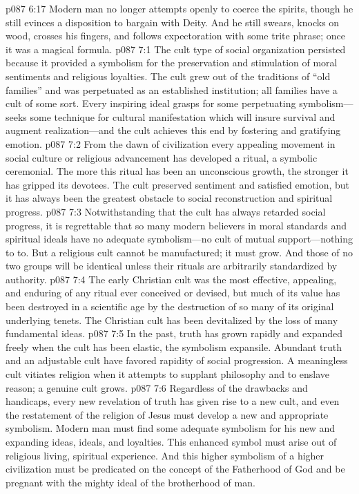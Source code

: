 \pc \vs p087 6:17 Modern man no longer attempts openly to coerce the spirits, though he still evinces a disposition to bargain with Deity. And he still swears, knocks on wood, crosses his fingers, and follows expectoration with some trite phrase; once it was a magical formula.
\vs p087 7:1 The cult type of social organization persisted because it provided a symbolism for the preservation and stimulation of moral sentiments and religious loyalties. The cult grew out of the traditions of “old families” and was perpetuated as an established institution; all families have a cult of some sort. Every inspiring ideal grasps for some perpetuating symbolism---seeks some technique for cultural manifestation which will insure survival and augment realization---and the cult achieves this end by fostering and gratifying emotion.
\vs p087 7:2 From the dawn of civilization every appealing movement in social culture or religious advancement has developed a ritual, a symbolic ceremonial. The more this ritual has been an unconscious growth, the stronger it has gripped its devotees. The cult preserved sentiment and satisfied emotion, but it has always been the greatest obstacle to social reconstruction and spiritual progress.
\vs p087 7:3 Notwithstanding that the cult has always retarded social progress, it is regrettable that so many modern believers in moral standards and spiritual ideals have no adequate symbolism---no cult of mutual support---nothing to  to. But a religious cult cannot be manufactured; it must grow. And those of no two groups will be identical unless their rituals are arbitrarily standardized by authority.
\vs p087 7:4 The early Christian cult was the most effective, appealing, and enduring of any ritual ever conceived or devised, but much of its value has been destroyed in a scientific age by the destruction of so many of its original underlying tenets. The Christian cult has been devitalized by the loss of many fundamental ideas.
\pc \vs p087 7:5 In the past, truth has grown rapidly and expanded freely when the cult has been elastic, the symbolism expansile. Abundant truth and an adjustable cult have favored rapidity of social progression. A meaningless cult vitiates religion when it attempts to supplant philosophy and to enslave reason; a genuine cult grows.
\pc \vs p087 7:6 Regardless of the drawbacks and handicaps, every new revelation of truth has given rise to a new cult, and even the restatement of the religion of Jesus must develop a new and appropriate symbolism. Modern man must find some adequate symbolism for his new and expanding ideas, ideals, and loyalties. This enhanced symbol must arise out of religious living, spiritual experience. And this higher symbolism of a higher civilization must be predicated on the concept of the Fatherhood of God and be pregnant with the mighty ideal of the brotherhood of man.
